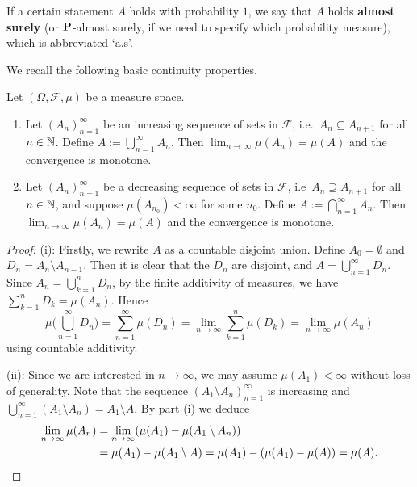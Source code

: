\begin{remark}
    If a certain statement $A$ holds with probability $1$, we say that $A$ holds \textbf{almost surely} (or $\mathbf{P}$-almost surely, if we need to specify which probability measure), which is abbreviated `a.s'.
\end{remark}

We recall the following basic continuity properties.
\begin{proposition}
\label{prop:cont-measures}
    Let $(\Omega,\mathcal{F},\mu)$ be a measure space.
    \begin{enumerate}[\upshape (i)]
    \item Let $(A_n)_{n=1}^\infty$ be an increasing sequence of sets in $\mathcal{F}$, i.e.\ $A_n \subseteq A_{n+1}$ for all $n\in\mathbb{N}$. Define $A := \bigcup_{n=1}^\infty A_n$. Then $\lim_{n \to \infty} \mu(A_n) = \mu(A)$ and the convergence is monotone.
    
    \item Let $(A_n)_{n=1}^\infty$ be a decreasing sequence of sets in $\mathcal{F}$, i.e\ $A_n \supseteq A_{n+1}$ for all $n\in\mathbb{N}$, and suppose $\mu(A_{n_0}) < \infty$ for some $n_0$. Define $A := \bigcap_{n=1}^\infty A_n$. Then $\lim_{n \to \infty} \mu(A_n) = \mu(A)$ and the convergence is monotone.
\end{enumerate}
\end{proposition}

\begin{proof}
    (i): Firstly, we rewrite $A$ as a countable disjoint union. Define $A_0 = \emptyset$ and $D_n = A_n \setminus A_{n-1}$. Then it is clear that the $D_n$ are disjoint, and $A = \bigcup_{n=1}^\infty D_n$. Since $A_n = \bigcup_{k=1}^n D_n$, by the finite additivity of measures, we have $\sum_{k=1}^n D_k = \mu(A_n)$. Hence
    \begin{equation*}
        \mu \bigg(\bigcup_{n=1}^\infty D_n \bigg) = \sum_{n=1}^\infty \mu(D_n) = \lim_{n\to\infty} \sum_{k=1}^n \mu(D_k) = \lim_{n\to\infty} \mu(A_n)
    \end{equation*}
    using countable additivity.

    (ii): Since we are interested in $n\to\infty$, we may assume $\mu(A_1) < \infty$ without loss of generality. Note that the sequence $(A_1 \setminus A_n)_{n=1}^\infty$ is increasing and $\bigcup_{n=1}^\infty (A_1 \setminus A_n) = A_1 \setminus A$. By part (i) we deduce
    \begin{align*}
        \lim_{n\to\infty}\mu(A_n) &= \lim_{n\to\infty} (\mu(A_1) - \mu(A_1 \setminus A_n)) \\
        &= \mu(A_1) - \mu(A_1 \setminus A) = \mu(A_1) - (\mu(A_1) - \mu(A)) = \mu(A). \qedhere
    \end{align*}
\end{proof}

